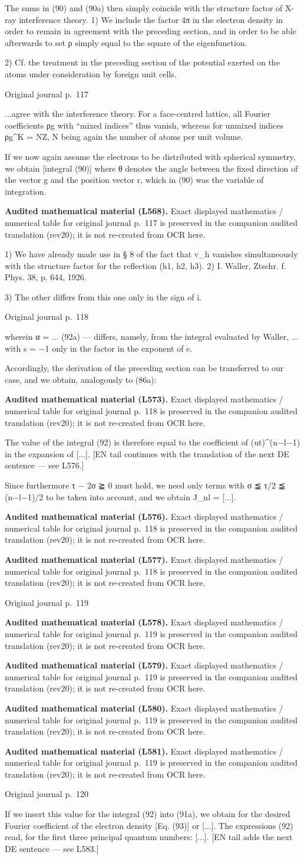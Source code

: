 \documentclass[10pt]{article}
\newcommand{\origpage}[1]{\par\medskip\noindent\hfill{\small\color{notegray}Original journal p.~#1}\hfill\mbox{}\par\smallskip}
\newcommand{\mathref}[2]{\par\smallskip\noindent\colorbox{gray!8}{\parbox{0.95\linewidth}{\small\color{notegray}\textbf{Audited mathematical material (L#1).} Exact displayed mathematics / numerical table for original journal p.~#2 is preserved in the companion audited translation (rev20); it is not re-created from OCR here.}}\par\smallskip}
\begin{document}
The sums in (90) and (90a) then simply coincide with the structure factor of X-ray interference theory. 1) We include the factor 4π in the electron density in order to remain in agreement with the preceding section, and in order to be able afterwards to set ρ simply equal to the square of the eigenfunction.\par
\noindent\footnotesize 2) Cf. the treatment in the preceding section of the potential exerted on the atoms under consideration by foreign unit cells.\par\normalsize
\origpage{117}
...agree with the interference theory. For a face-centred lattice, all Fourier coefficients ρg with “mixed indices” thus vanish, whereas for unmixed indices ρg\textasciicircum{}K = NZ, N being again the number of atoms per unit volume.\par
If we now again assume the electrons to be distributed with spherical symmetry, we obtain [integral (90)] where θ denotes the angle between the fixed direction of the vector g and the position vector r, which in (90) was the variable of integration.\par
\mathref{568}{117}
\noindent\footnotesize 1) We have already made use in § 8 of the fact that v\_h vanishes simultaneously with the structure factor for the reflection (h1, h2, h3). 2) I. Waller, Ztschr. f. Phys. 38, p. 644, 1926.\par\normalsize
\noindent\footnotesize 3) The other differs from this one only in the sign of i.\par\normalsize
\origpage{118}
wherein α = ... (92a) — differs, namely, from the integral evaluated by Waller, ... with s = −1 only in the factor in the exponent of e.\par
Accordingly, the derivation of the preceding section can be transferred to our case, and we obtain, analogously to (86a):\par
\mathref{573}{118}
The value of the integral (92) is therefore equal to the coefficient of (ut)\textasciicircum{}(n−l−1) in the expansion of [...]. [EN tail continues with the translation of the next DE sentence — see L576.]\par
Since furthermore τ − 2σ ≧ 0 must hold, we need only terms with σ ≦ τ/2 ≦ (n−l−1)/2 to be taken into account, and we obtain J\_nl = [...].\par
\mathref{576}{118}
\mathref{577}{118}
\origpage{119}
\mathref{578}{119}
\mathref{579}{119}
\mathref{580}{119}
\mathref{581}{119}
\origpage{120}
If we insert this value for the integral (92) into (91a), we obtain for the desired Fourier coefficient of the electron density [Eq. (93)] or [...]. The expressions (92) read, for the first three principal quantum numbers: [...]. [EN tail adds the next DE sentence — see L583.]\par
\end{document}
